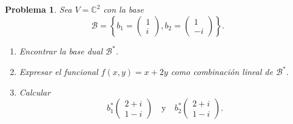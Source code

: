 \documentclass[a4,10pt]{aleph-notas}
\newtheorem*{prob}{Problema}
\begin{document}
\encabezado

\noindent

\begin{prob}
Sea $V=\mathbb{C}^2$ con la base
\[
    \mathcal{B}=\left\{
        b_1=\begin{pmatrix}1\\ i\end{pmatrix},
        b_2=\begin{pmatrix}1\\ -i\end{pmatrix}
    \right\}.
\]
\begin{enumerate}
    \item Encontrar la base dual $\mathcal{B}^*$.
    \item Expresar el funcional $f(x,y)=x+2y$ como combinación lineal de $\mathcal{B}^*$.
    \item Calcular
    \[
        b_1^*\begin{pmatrix}2+i\\ 1-i\end{pmatrix}
        \quad \text{y} \quad
        b_2^*\begin{pmatrix}2+i\\ 1-i\end{pmatrix}.
    \]
\end{enumerate}
\end{prob}
\end{document}
